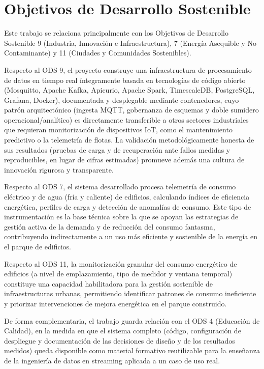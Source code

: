 \section{Objetivos de Desarrollo Sostenible}

Este trabajo se relaciona principalmente con los Objetivos de Desarrollo Sostenible 9 (Industria, Innovación e Infraestructura), 7 (Energía Asequible y No Contaminante) y 11 (Ciudades y Comunidades Sostenibles).

Respecto al ODS 9, el proyecto construye una infraestructura de procesamiento de datos en tiempo real íntegramente basada en tecnologías de código abierto (Mosquitto, Apache Kafka, Apicurio, Apache Spark, TimescaleDB, PostgreSQL, Grafana, Docker), documentada y desplegable mediante contenedores, cuyo patrón arquitectónico (ingesta MQTT, gobernanza de esquemas y doble sumidero operacional/analítico) es directamente transferible a otros sectores industriales que requieran monitorización de dispositivos IoT, como el mantenimiento predictivo o la telemetría de flotas. La validación metodológicamente honesta de sus resultados (pruebas de carga y de recuperación ante fallos medidas y reproducibles, en lugar de cifras estimadas) promueve además una cultura de innovación rigurosa y transparente.

Respecto al ODS 7, el sistema desarrollado procesa telemetría de consumo eléctrico y de agua (fría y caliente) de edificios, calculando índices de eficiencia energética, perfiles de carga y detección de anomalías de consumo. Este tipo de instrumentación es la base técnica sobre la que se apoyan las estrategias de gestión activa de la demanda y de reducción del consumo fantasma, contribuyendo indirectamente a un uso más eficiente y sostenible de la energía en el parque de edificios.

Respecto al ODS 11, la monitorización granular del consumo energético de edificios (a nivel de emplazamiento, tipo de medidor y ventana temporal) constituye una capacidad habilitadora para la gestión sostenible de infraestructuras urbanas, permitiendo identificar patrones de consumo ineficiente y priorizar intervenciones de mejora energética en el parque construido.

De forma complementaria, el trabajo guarda relación con el ODS 4 (Educación de Calidad), en la medida en que el sistema completo (código, configuración de despliegue y documentación de las decisiones de diseño y de los resultados medidos) queda disponible como material formativo reutilizable para la enseñanza de la ingeniería de datos en streaming aplicada a un caso de uso real.
